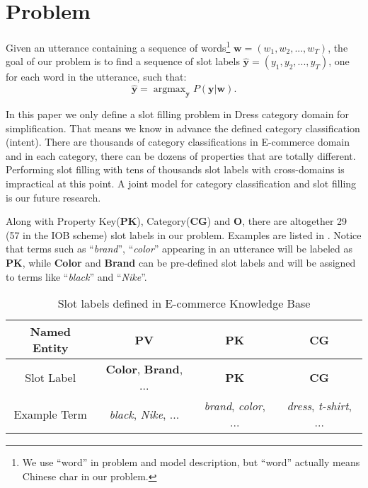 \section{Problem}
\label{sec:problem}
Given an utterance containing a sequence of
words\footnote{We use ``word'' in problem and model description,
	but ``word'' actually means Chinese char in our problem.} 
$\textbf{w} = (w_1, w_2, ..., w_T)$,
the goal of our problem
is to find a sequence of slot labels $\hat{\textbf{y}} = (y_1, y_2, ..., y_T)$, 
one for each word in the utterance, such that:
\begin{equation*}
	\hat{\textbf{y}} = \mathop{\arg\max}_{\textbf{y}}P(\textbf{y}|\textbf{w}).
\end{equation*}

In this paper we only define a slot filling problem in Dress category domain for simplification.
That means we know in advance the defined category classification (intent).
There are thousands of category classifications in E-commerce domain
and in each category, there can be dozens of properties that 
are totally different.  Performing slot filling with tens of thousands 
slot labels with cross-domains is impractical at this point.
A joint model for category classification and slot filling is 
our future research.

Along with Property Key(\textbf{PK}), Category(\textbf{CG}) and \textbf{O},
there are altogether 29 (57 in the IOB scheme) slot labels in our problem. 
Examples are listed in .
Notice that terms such as ``\emph{brand}'', ``\emph{color}''
appearing in an utterance
will be labeled as \textbf{PK},
while \textbf{Color} and \textbf{Brand} can be pre-defined slot labels
and will be assigned to terms like
``\emph{black}'' and ``\emph{Nike}''.
\begin{table}[htbp]
	\caption{Slot labels defined in E-commerce Knowledge Base}
	\label{tab:slot-labels}
	\centering
	\scriptsize
	\begin{tabular}{c|c|c|c}
		\toprule
		Named Entity & PV & PK & CG \\
		\midrule
		Slot Label & \textbf{Color}, \textbf{Brand}, ... & \textbf{PK} & \textbf{CG} \\
		\midrule
		Example Term & \emph{black}, \emph{Nike}, ... & \emph{brand}, \emph{color}, ... & \emph{dress}, \emph{t-shirt}, ... \\
		\bottomrule
	\end{tabular}
	\vspace{-10pt}
\end{table}


